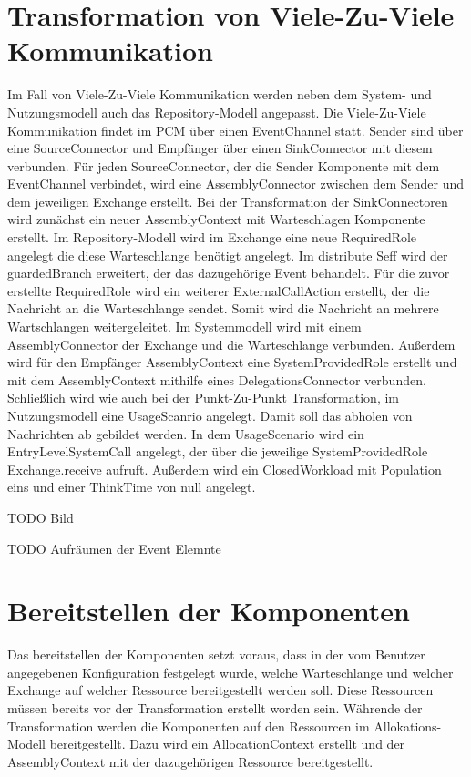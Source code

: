 \section{Transformation von Viele-Zu-Viele Kommunikation}
Im Fall von Viele-Zu-Viele Kommunikation werden neben dem System- und Nutzungsmodell auch das Repository-Modell angepasst. Die Viele-Zu-Viele Kommunikation findet im PCM über einen EventChannel statt. Sender sind über eine SourceConnector und Empfänger über einen SinkConnector mit diesem verbunden. Für jeden SourceConnector, der die Sender Komponente mit dem EventChannel verbindet, wird eine AssemblyConnector zwischen dem Sender und dem jeweiligen Exchange erstellt. Bei der Transformation der SinkConnectoren wird zunächst ein neuer AssemblyContext mit Warteschlagen Komponente erstellt. Im Repository-Modell wird im Exchange eine neue RequiredRole angelegt die diese Warteschlange benötigt angelegt. Im distribute Seff wird der guardedBranch erweitert, der das dazugehörige Event behandelt. Für die zuvor erstellte RequiredRole wird ein weiterer ExternalCallAction erstellt, der die Nachricht an die Warteschlange sendet. Somit wird die Nachricht an mehrere Wartschlangen weitergeleitet. Im Systemmodell wird mit einem AssemblyConnector der Exchange und die Warteschlange verbunden. Außerdem wird für den Empfänger AssemblyContext eine SystemProvidedRole erstellt und mit dem AssemblyContext mithilfe eines DelegationsConnector verbunden. Schließlich wird wie auch bei der Punkt-Zu-Punkt Transformation, im Nutzungsmodell eine UsageScanrio angelegt. Damit soll das abholen von Nachrichten ab gebildet werden. In dem UsageScenario wird ein EntryLevelSystemCall angelegt, der über die jeweilige SystemProvidedRole Exchange.receive aufruft. Außerdem wird ein ClosedWorkload mit Population eins und einer ThinkTime von null angelegt.


TODO Bild

TODO Aufräumen der Event Elemnte

\section{Bereitstellen der Komponenten}
Das bereitstellen der Komponenten setzt voraus, dass in der vom Benutzer angegebenen Konfiguration festgelegt wurde, welche Warteschlange und welcher Exchange auf welcher Ressource bereitgestellt werden soll. Diese Ressourcen müssen bereits vor der Transformation erstellt worden sein. Währende der Transformation werden die Komponenten auf den Ressourcen im Allokations-Modell bereitgestellt. Dazu wird ein AllocationContext erstellt und der AssemblyContext mit der dazugehörigen Ressource bereitgestellt.

